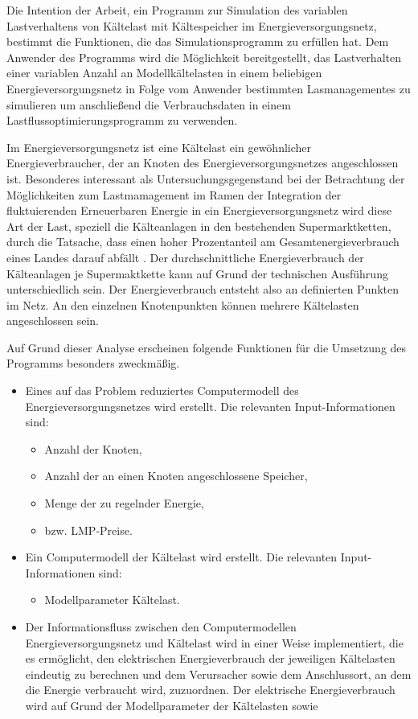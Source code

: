 Die Intention der Arbeit, ein Programm zur Simulation des variablen Lastverhaltens von Kältelast mit Kältespeicher im
Energieversorgungsnetz, bestimmt die Funktionen, die das Simulationsprogramm zu erfüllen hat. Dem Anwender des Programms wird
die Möglichkeit bereitgestellt, das Lastverhalten einer variablen Anzahl an Modellkältelasten in einem beliebigen
Energieversorgungsnetz in Folge vom Anwender bestimmten Lasmanagementes zu simulieren um anschließend die Verbrauchsdaten in
einem Lastflussoptimierungsprogramm zu verwenden.


Im Energieversorgungsnetz ist eine Kältelast ein gewöhnlicher Energieverbraucher, der an Knoten des Energieversorgungsnetzes
angeschlossen ist. Besonderes interessant als Untersuchungsgegenstand bei der Betrachtung der Möglichkeiten zum Lastmamagement
im Ramen der Integration der fluktuierenden Erneuerbaren Energie in ein Energieversorgungsnetz wird diese Art der Last,
speziell die Kälteanlagen in den bestehenden Supermarktketten, durch die Tatsache, dass einen hoher Prozentanteil am
Gesamtenergieverbrauch eines Landes darauf abfällt \cite{doctor}. Der durchschnittliche Energieverbrauch der
Kälteanlagen je Supermaktkette kann auf Grund der technischen Ausführung unterschiedlich sein. Der Energieverbrauch entsteht
also an definierten Punkten im Netz. An den einzelnen Knotenpunkten können mehrere Kältelasten angeschlossen sein.

Auf Grund dieser Analyse erscheinen folgende Funktionen für die Umsetzung des Programms besonders zweckmäßig.

\begin{itemize}
	\item Eines auf das Problem reduziertes Computermodell des Energieversorgungsnetzes wird erstellt. Die relevanten
	Input-Informationen sind:
	\begin{itemize}
		\item Anzahl der Knoten,
		\item Anzahl der an einen Knoten angeschlossene Speicher,
		\item Menge der zu regelnder Energie,
		\item bzw. LMP-Preise.
	\end{itemize}
	\item Ein Computermodell der Kältelast wird erstellt. Die relevanten Input-Informationen sind:
	\begin{itemize}
		\item Modellparameter Kältelast.
	\end{itemize}
	\item Der Informationsfluss zwischen den Computermodellen Energieversorgungsnetz und Kältelast wird in einer Weise
	implementiert, die es ermöglicht, den elektrischen Energieverbrauch der jeweiligen Kältelasten eindeutig zu berechnen
	und dem Verursacher sowie dem Anschlussort, an dem die Energie verbraucht wird, zuzuordnen. Der elektrische
	Energieverbrauch wird auf Grund der Modellparameter der Kältelasten sowie 
\end{itemize}


